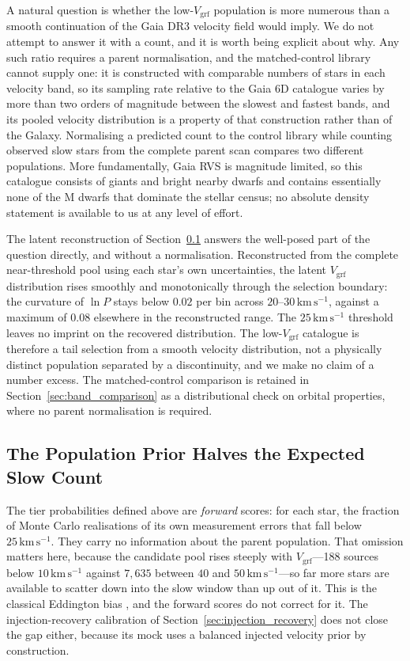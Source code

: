 \documentclass{aa}  %
\newcommand{\vgrf}{\ensuremath{V_{\mathrm{grf}}}\xspace}
\newcommand{\kms}{\ensuremath{\,\mathrm{km\,s^{-1}}}\xspace}
\begin{document}
A natural question is whether the low-\vgrf{} population is more numerous
than a smooth continuation of the Gaia DR3 velocity field would imply.
We do not attempt to answer it with a count, and it is worth being
explicit about why.  Any such ratio requires a parent normalisation, and
the matched-control library cannot supply one: it is constructed with
comparable numbers of stars in each velocity band, so its sampling rate
relative to the Gaia 6D catalogue varies by more than two orders of
magnitude between the slowest and fastest bands, and its pooled velocity
distribution is a property of that construction rather than of the
Galaxy.  Normalising a predicted count to the control library while
counting observed slow stars from the complete parent scan compares two
different populations.  More fundamentally, Gaia RVS is magnitude
limited, so this catalogue consists of giants and bright nearby dwarfs
and contains essentially none of the M dwarfs that dominate the stellar
census; no absolute density statement is available to us at any level of
effort.

The latent reconstruction of Section~\ref{sec:latent} answers the
well-posed part of the question directly, and without a normalisation.
Reconstructed from the complete near-threshold pool using each star's own
uncertainties, the latent \vgrf{} distribution rises smoothly and
monotonically through the selection boundary: the curvature of $\ln P$
stays below $0.02$ per bin across $20$--$30\kms$, against a maximum of
$0.08$ elsewhere in the reconstructed range.  The $25\kms$ threshold
leaves no imprint on the recovered distribution.  The low-\vgrf{}
catalogue is therefore a tail selection from a smooth velocity
distribution, not a physically distinct population separated by a
discontinuity, and we make no claim of a number excess.  The
matched-control comparison is retained in
Section~\ref{sec:band_comparison} as a distributional check on orbital
properties, where no parent normalisation is required.

\subsection{The Population Prior Halves the Expected Slow Count}
\label{sec:latent}

The tier probabilities defined above are \emph{forward} scores: for each
star, the fraction of Monte Carlo realisations of its own measurement
errors that fall below $25\kms$.  They carry no information about the
parent population.  That omission matters here, because the candidate
pool rises steeply with \vgrf{}---188 sources below $10\kms$ against
$7{,}635$ between $40$ and $50\kms$---so far more stars are available to
scatter down into the slow window than up out of it.  This is the
classical Eddington bias \citep{Eddington1913}, and the forward scores do
not correct for it.
The injection-recovery calibration of
Section~\ref{sec:injection_recovery} does not close the gap either,
because its mock uses a balanced injected velocity prior by construction.
\end{document}
